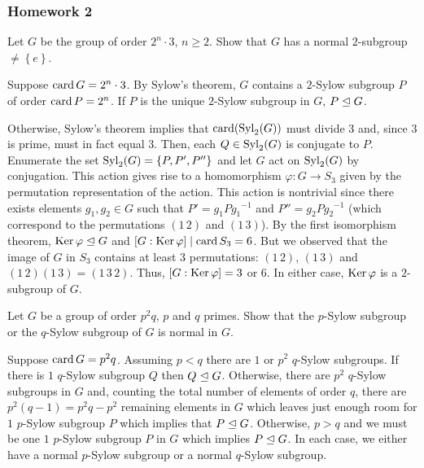 \subsubsection{Homework 2}
\setcounter{exercise}{0}
\setcounter{equation}{0}

\begin{problem}
  Let \(G\) be the group of order \(2^n\cdot 3\), \(n\geq 2\). Show that
  \(G\) has a normal \(2\)-subgroup \(\neq\left\{e\right\}\).
\end{problem}
\begin{solution}
  Suppose \(\operatorname{card} G=2^n\cdot 3\). By Sylow's theorem, \(G\) contains a
  \(2\)-Sylow subgroup \(P\) of order \(\operatorname{card} P=2^n\). If \(P\) is the
  unique \(2\)-Sylow subgroup in \(G\), \(P\trianglelefteq G\).

  Otherwise, Sylow's theorem implies that \(\operatorname{card}({\operatorname{Syl}_2(G)})\) must
  divide \(3\) and, since \(3\) is prime, must in fact equal \(3\). Then,
  each \(Q\in\operatorname{Syl}_2(G)\) is conjugate to \(P\). Enumerate the set
  \(\operatorname{Syl}_2(G)=\left\{P,P',P''\right\}\) and let \(G\) act on \(\operatorname{Syl}_2(G)\)
  by conjugation. This action gives rise to a homomorphism
  \(\varphi\colon G\to S_3\) given by the permutation representation of the
  action. This action is nontrivial since there exists elements
  \(g_1,g_2\in G\) such that \(P'=g_1P{g_1}^{-1}\) and
  \(P''=g_2P{g_2}^{-1}\) (which correspond to the permutations \((1\,2)\)
  and \((1\,3)\)). By the first isomorphism theorem,
  \(\operatorname{Ker}\varphi\trianglelefteq G\) and \([G:{\operatorname{Ker}\varphi}]\mid \operatorname{card} S_3=6\). But
  we observed that the image of \(G\) in \(S_3\) contains at least \(3\)
  permutations: \((1\,2)\), \((1\,3)\) and
  \((1\,2)(1\,3)=(1\,3\,2)\). Thus, \([G:{\operatorname{Ker}\varphi}]=3\) or \(6\). In
  either case, \(\operatorname{Ker}\varphi\) is a \(2\)-subgroup of \(G\).
\end{solution}

\begin{problem}
  Let \(G\) be a group of order \(p^2q\), \(p\) and \(q\) primes. Show that
  the \(p\)-Sylow subgroup or the \(q\)-Sylow subgroup of \(G\) is normal
  in \(G\).
\end{problem}
\begin{solution}
  Suppose \(\operatorname{card} G=p^2q\). Assuming \(p<q\) there are \(1\) or \(p^2\)
  \(q\)-Sylow subgroups. If there is \(1\) \(q\)-Sylow subgroup \(Q\) then
  \(Q\trianglelefteq G\). Otherwise, there are \(p^2\) \(q\)-Sylow subgroups in
  \(G\) and, counting the total number of elements of order \(q\), there
  are \(p^2(q-1)=p^2q-p^2\) remaining elements in \(G\) which leaves just
  enough room for \(1\) \(p\)-Sylow subgroup \(P\) which implies that
  \(P\trianglelefteq G\). Otherwise, \(p>q\) and we must be one \(1\) \(p\)-Sylow
  subgroup \(P\) in \(G\) which implies \(P\trianglelefteq G\). In each case, we
  either have a normal \(p\)-Sylow subgroup or a normal \(q\)-Sylow
  subgroup.
\end{solution}

